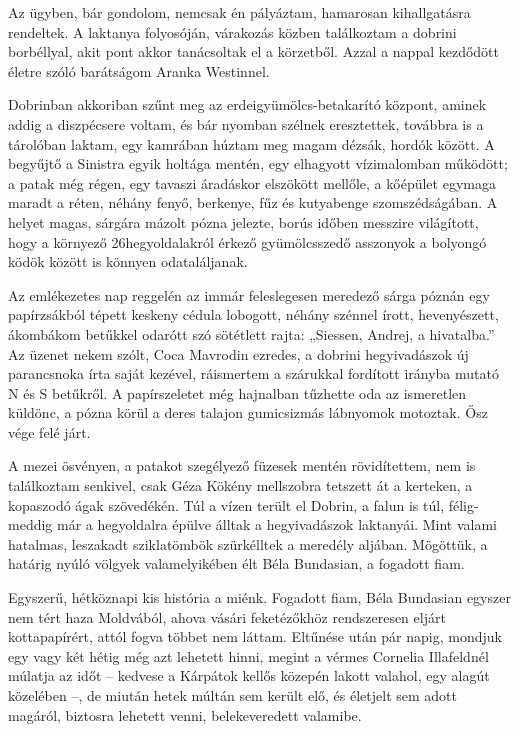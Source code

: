 \documentclass{IEEEtran}
\begin{document}
Az ügyben, bár gondolom, nemcsak én pályáztam, hamarosan kihallgatásra
rendeltek. A laktanya folyosóján, várakozás közben találkoztam a dobrini
borbéllyal, akit pont akkor tanácsoltak el a körzetből. Azzal a nappal
kezdődött életre szóló barátságom Aranka Westinnel.

Dobrinban akkoriban szűnt meg az erdeigyümölcs-betakarító központ, aminek
addig a diszpécsere voltam, és bár nyomban szélnek eresztettek, továbbra is a
tárolóban laktam, egy kamrában húztam meg magam dézsák, hordók között. A
begyűjtő a Sinistra egyik holtága mentén, egy elhagyott vízimalomban működött;
a patak még régen, egy tavaszi áradáskor elszökött mellőle, a kőépület egymaga
maradt a réten, néhány fenyő, berkenye, fűz és kutyabenge szomszédságában. A
helyet magas, sárgára mázolt pózna jelezte, borús időben messzire világított,
hogy a környező 26hegyoldalakról érkező gyümölcsszedő asszonyok a bolyongó
ködök között is könnyen odataláljanak.

Az emlékezetes nap reggelén az immár feleslegesen meredező sárga póznán egy
papírzsákból tépett keskeny cédula lobogott, néhány szénnel írott,
hevenyészett, ákombákom betűkkel odarótt szó sötétlett rajta: „Siessen,
Andrej, a hivatalba.” Az üzenet nekem szólt, Coca Mavrodin ezredes, a dobrini
hegyivadászok új parancsnoka írta saját kezével, ráismertem a szárukkal
fordított irányba mutató N és S betűkről. A papírszeletet még hajnalban
tűzhette oda az ismeretlen küldönc, a pózna körül a deres talajon gumicsizmás
lábnyomok motoztak. Ősz vége felé járt.

A mezei ösvényen, a patakot szegélyező füzesek mentén rövidítettem, nem is
találkoztam senkivel, csak Géza Kökény mellszobra tetszett át a kerteken, a
kopaszodó ágak szövedékén. Túl a vízen terült el Dobrin, a falun is túl,
félig-meddig már a hegyoldalra épülve álltak a hegyivadászok laktanyái. Mint
valami hatalmas, leszakadt sziklatömbök szürkélltek a meredély aljában.
Mögöttük, a határig nyúló völgyek valamelyikében élt Béla Bundasian, a
fogadott fiam.

Egyszerű, hétköznapi kis história a miénk. Fogadott fiam, Béla Bundasian
egyszer nem tért haza Moldvából, ahova vásári feketézőkhöz rendszeresen eljárt
kottapapírért, attól fogva többet nem láttam. Eltűnése után pár napig, mondjuk
egy vagy két hétig még azt lehetett hinni, megint a vérmes Cornelia
Illafeldnél múlatja az időt – kedvese a Kárpátok kellős közepén lakott
valahol, egy alagút közelében –, de miután hetek múltán sem került elő, és
életjelt sem adott magáról, biztosra lehetett venni, belekeveredett valamibe.
\end{document}

